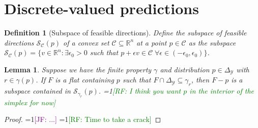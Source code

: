 \documentclass{article}
\newcommand{\Comments}{1}
\newcommand{\mynote}[2]{\ifnum\Comments=1\textcolor{#1}{#2}\fi}
\newcommand{\raf}[1]{\mynote{green}{[RF: #1]}}
\newcommand{\jessie}[1]{\mynote{purple}{[JF: #1]}}
\newcommand{\reals}{\mathbb{R}}
\newcommand{\simplex}{\Delta_\Y}
\newcommand{\C}{\mathcal{C}}
\newcommand{\R}{\mathcal{R}}
\renewcommand{\S}{\mathcal{S}}
\newcommand{\Y}{\mathcal{Y}}
\newtheorem{lemma}{Lemma}
\newtheorem{definition}{Definition}
\begin{document}
\section{Discrete-valued predictions}\label{sec:finite-calib}


\begin{definition}[Subspace of feasible directions]
	Define the \emph{subspace of feasible directions} $\S_\C(p)$ of a convex set $\C \subseteq \reals^n$ at a point $p \in \C$ as the subspace $\S_\C(p) = \{ v \in \reals^n : \exists \epsilon_0 > 0 $ such that $p + \epsilon v \in \C \; \forall \epsilon \in (-\epsilon_0,\epsilon_0) \}$.
\end{definition}

\begin{lemma}\label{lem:feas-sub-is-a-flat}
	Suppose we have the finite property $\gamma$ and distribution $p \in \simplex$ with $r \in \gamma(p)$.
	If $F$ is a flat containing $p$ such that $F \cap \simplex \subseteq \gamma_r$, then $F - p$ is a subspace contained in $\S_{\gamma_r}(p)$.
  \raf{I think you want $p$ in the interior of the simplex for now}
\end{lemma}
\begin{proof}
  \jessie{...}
  \raf{Time to take a crack}
\end{proof}
\end{document}

